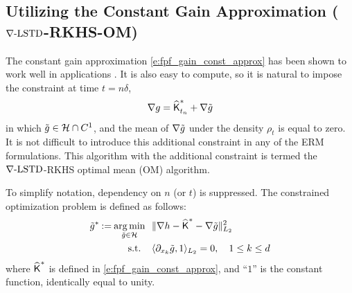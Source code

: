\subsection{Utilizing the Constant Gain Approximation ($\nabla\text{-LSTD}$-RKHS-OM)}
\label{s:rkhs_om}

The constant gain approximation \eqref{e:fpf_gain_const_approx} has been shown to work well in applications \cite{tilghiomeh13}. It is also easy to compute, so it is natural to impose the constraint at time $t=n\delta$,
\[
\nabla g =  \widehat{\text{\sf K}}^*_{t_n} +  \nabla \tilde g
\]
in which $\tilde g\in {\cal H} \cap C^1$,  and the mean of  $ \nabla \tilde g$ under the density $\rho_t$ is equal to zero.
It is not difficult to introduce this additional constraint in any of the ERM formulations.  This algorithm with the additional constraint is termed the $\nabla\text{-LSTD}$-RKHS optimal mean (OM) algorithm.


To simplify notation, dependency on $n$ (or $t$) is suppressed. The constrained optimization problem is defined as follows:
\[
\begin{aligned}
\tilde g^*  \mathbin{:=} \mathop{\rm arg{\,}min}_{\tilde g\in{\cal H}} \ \  &   \| \nabla h - \widehat{\text{\sf K}}^* - \nabla \tilde g \|^2_{L_2} \\
\text{s.t. }  \ \   & \langle \partial_{x_k} \tilde g , 1 \rangle_{L_2} = 0, \quad     1\le  k \le d
\end{aligned}
\]
where $\widehat{\text{\sf K}}^*$ is defined in \eqref{e:fpf_gain_const_approx},  and ``$1$'' is the constant function, identically equal to unity.


